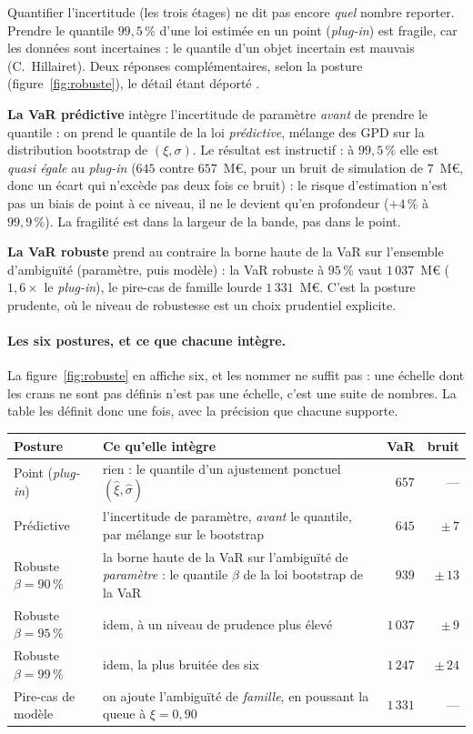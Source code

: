 Quantifier l'incertitude (les trois étages) ne dit pas encore \emph{quel} nombre reporter.
Prendre le quantile $99{,}5\,\%$ d'une loi estimée en un point (\emph{plug-in}) est fragile,
car les données sont incertaines : \og{}le quantile d'un objet incertain est mauvais\fg{}
(C.~Hillairet). Deux réponses complémentaires, selon la posture (figure~\ref{fig:robuste}),
le détail étant déporté \matcomp.

\textbf{La VaR prédictive} intègre l'incertitude de paramètre \emph{avant} de prendre le
quantile : on prend le quantile de la loi \emph{prédictive}, mélange des GPD sur la distribution
bootstrap de $(\xi,\sigma)$. Le résultat est instructif : à $99{,}5\,\%$ elle est \emph{quasi
égale} au \emph{plug-in} ($645$ contre $657$~M\euro, pour un bruit de simulation de $7$~M\euro,
donc un écart qui n'excède pas deux fois ce bruit) : le risque d'estimation n'est pas un
biais de point à ce niveau, il ne le devient qu'en profondeur ($+4\,\%$ à $99{,}9\,\%$). La
fragilité est dans la largeur de la bande, pas dans le point.

\textbf{La VaR robuste} prend au contraire la borne haute de la VaR sur l'ensemble
d'ambiguïté (paramètre, puis modèle) : la VaR robuste à $95\,\%$ vaut $1\,037$~M\euro{}
($1{,}6\times$ le \emph{plug-in}), le pire-cas de famille lourde $1\,331$~M\euro. C'est la
posture prudente, où le niveau de robustesse est un choix prudentiel explicite.

\paragraph{Les six postures, et ce que chacune intègre.} La figure~\ref{fig:robuste} en affiche
six, et les nommer ne suffit pas : une échelle dont les crans ne sont pas définis n'est pas une
échelle, c'est une suite de nombres. La table les définit donc une fois, avec la précision que
chacune supporte.

\begin{center}\footnotesize
\renewcommand{\arraystretch}{1.25}
\begin{tabular}{@{}l p{6.6cm} r r@{}}
\toprule
\textbf{Posture} & \textbf{Ce qu'elle intègre} & \textbf{VaR} & \textbf{bruit} \\
\midrule
Point (\emph{plug-in}) & rien : le quantile d'un ajustement ponctuel $(\hat\xi,\hat\sigma)$ & $657$ & --- \\
Prédictive & l'incertitude de paramètre, \emph{avant} le quantile, par mélange sur le bootstrap & $645$ & $\pm\,7$ \\
Robuste $\beta=90\,\%$ & la borne haute de la VaR sur l'ambiguïté de \emph{paramètre} : le quantile $\beta$ de la loi bootstrap de la VaR & $939$ & $\pm\,13$ \\
Robuste $\beta=95\,\%$ & idem, à un niveau de prudence plus élevé & $1\,037$ & $\pm\,9$ \\
Robuste $\beta=99\,\%$ & idem, la plus bruitée des six & $1\,247$ & $\pm\,24$ \\
Pire-cas de modèle & on ajoute l'ambiguïté de \emph{famille}, en poussant la queue à $\xi=0{,}90$ & $1\,331$ & --- \\
\bottomrule
\end{tabular}
\end{center}

